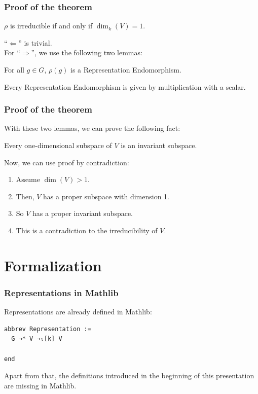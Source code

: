 \documentclass{beamer}
\begin{document}
\begin{frame}
\frametitle{Proof of the theorem}
\begin{theorem}
\(\rho\) is irreducible if and only if \(\dim_k(V) = 1\).
\end{theorem}
\pause
\enquote{\(\Leftarrow\)} is trivial.\\
\pause
For \enquote{\(\Rightarrow\)}, we use the following two lemmas:
\begin{lemma}
For all \(g \in G\), \(\rho(g)\) is a Representation Endomorphism.
\end{lemma}
\pause
\begin{lemma}
Every Representation Endomorphism is given by multiplication with a scalar.
\end{lemma}
\end{frame}


\begin{frame}
\frametitle{Proof of the theorem}
With these two lemmas, we can prove the following fact:
\begin{lemma}
Every one-dimensional subspace of \(V\) is an invariant subspace.
\end{lemma}
\pause
Now, we can use proof by contradiction:
\pause
\begin{enumerate}
\item Assume \(\dim (V) > 1\).
\pause
\item Then, \(V\) has a proper subspace with dimension 1.
\pause
\item So \(V\) has a proper invariant subspace.
\pause
\item This is a contradiction to the irreducibility of \(V\).
\end{enumerate}
\end{frame}

\section{Formalization}
\begin{frame}[fragile]
\frametitle{Representations in Mathlib}
Representations are already defined in Mathlib:
\begin{lstlisting}
abbrev Representation :=
  G →* V →ₗ[k] V

end
\end{lstlisting}
\pause
Apart from that, the definitions introduced in the beginning of this presentation are missing in Mathlib.
\end{frame}
\end{document}
